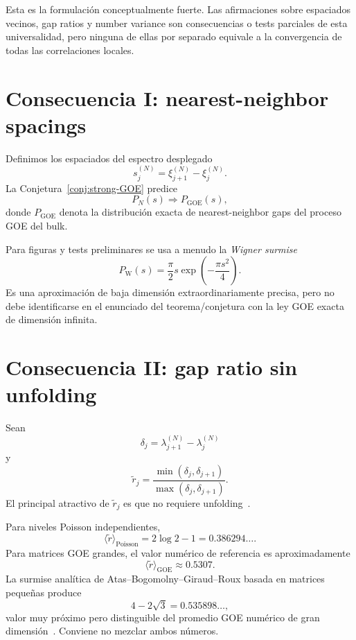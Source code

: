 \documentclass[11pt,a4paper]{article}
\newcommand{\GOE}{\mathrm{GOE}}
\newcommand{\Poisson}{\mathrm{Poisson}}
\begin{document}
Esta es la formulación conceptualmente fuerte. Las afirmaciones sobre espaciados vecinos, gap ratios y number variance son consecuencias o tests parciales de esta universalidad, pero ninguna de ellas por separado equivale a la convergencia de todas las correlaciones locales.

\section{Consecuencia I: nearest-neighbor spacings}

Definimos los espaciados del espectro desplegado
\begin{equation}
s_j^{(N)}=\xi_{j+1}^{(N)}-\xi_j^{(N)}.
\end{equation}
La Conjetura~\ref{conj:strong-GOE} predice
\begin{equation}
P_N(s)\Longrightarrow P_{\GOE}(s),
\label{eq:spacing-conj}
\end{equation}
donde $P_{\GOE}$ denota la distribución exacta de nearest-neighbor gaps del proceso GOE del bulk.

Para figuras y tests preliminares se usa a menudo la \emph{Wigner surmise}
\begin{equation}
P_{\mathrm W}(s)=\frac{\pi}{2}s\exp\!\left(-\frac{\pi s^2}{4}\right).
\label{eq:wigner-surmise}
\end{equation}
Es una aproximación de baja dimensión extraordinariamente precisa, pero no debe identificarse en el enunciado del teorema/conjetura con la ley GOE exacta de dimensión infinita.

\section{Consecuencia II: gap ratio sin unfolding}

Sean
\begin{equation}
\delta_j=\lambda_{j+1}^{(N)}-\lambda_j^{(N)}
\end{equation}
y
\begin{equation}
\widetilde r_j
=\frac{\min(\delta_j,\delta_{j+1})}
{\max(\delta_j,\delta_{j+1})}.
\label{eq:gapratio}
\end{equation}
El principal atractivo de $\widetilde r_j$ es que no requiere unfolding~\cite{OganesyanHuse2007,Atas2013}.

Para niveles Poisson independientes,
\begin{equation}
\langle\widetilde r\rangle_{\Poisson}
=2\log2-1
=0.386294\ldots.
\end{equation}
Para matrices GOE grandes, el valor numérico de referencia es aproximadamente
\begin{equation}
\boxed{\langle\widetilde r\rangle_{\GOE}\approx0.5307.}
\label{eq:rgoe}
\end{equation}
La surmise analítica de Atas--Bogomolny--Giraud--Roux basada en matrices pequeñas produce
\begin{equation}
4-2\sqrt3=0.535898\ldots,
\end{equation}
valor muy próximo pero distinguible del promedio GOE numérico de gran dimensión~\cite{Atas2013}. Conviene no mezclar ambos números.
\end{document}

